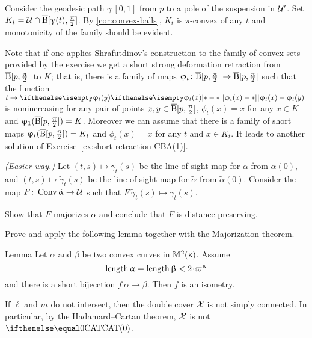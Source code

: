 Consider the geodesic path $\gamma\:[0,1]$ from $p$ to a pole of the suspension in $\mathcal{U}'$.
Set $K_t=\spc{U}\cap\cBall[\gamma(t),\tfrac\pi2]$.
By \ref{cor:convex-balls}, $K_t$ is $\pi$-convex of any $t$ and monotonicity of the family should be evident.

Note that if one applies Shrafutdinov's construction to the family of convex sets provided by the exercise we get a short strong deformation retraction from $\overline{\mathrm{B}}{}[p,\tfrac{\uppi}2]$ to $K$;
that is, there is a family of maps $\phi_t\:\cBall[p,\tfrac\pi2]\to \cBall[p,\tfrac\pi2]$ such that 
the function $t\mapsto \dist{\phi_t(x)}{\phi_t(y)}{}$ is nonincreasing for any pair of points $x,y\in\cBall[p,\tfrac\pi2]$, $\phi_t(x)=x$ for any $x\in K$ and $\upvarphi_1(\overline{\mathrm{B}}{}[p,\tfrac{\uppi}2])=K$. 
Moreover we can assume that there is a family of short maps $\upvarphi_t(\overline{\mathrm{B}}{}[p,\tfrac{\uppi}2])= K_t$ and $\phi_t(x)=x$ for any $t$ and $x\in K_t$.
It leads to another solution of Exercise~\ref{ex:short-retraction-CBA(1)}.




\textit{(Easier way.)} 
Let 
$(t,s)\mapsto \gamma_t(s)$ be the line-of-sight map 
for $\alpha$ from $\alpha(0)$,
and 
$(t,s)\mapsto \tilde \gamma_t(s)$ be the line-of-sight map 
for $\tilde \alpha$ from $\tilde \alpha(0)$.
Consider the map  $F\:\Conv\tilde \alpha\to \spc{U}$ such that 
$F\:\tilde \gamma_t(s)\mapsto \gamma_t(s)$.

Show that $F$ majorizes $\alpha$
and conclude that $F$ is distance-preserving.

Prove and apply the following lemma together with the Majorization theorem.
\begin{thm}{Lemma}\label{lem:short+convex}
Let $\alpha$ and $\beta$ be two convex curves in $\mathbb{M}_{{}}^{2}({\upkappa})$.
Assume 
\[\length \alpha=\length\beta<2\cdot\varpi\kappa\]
and there is a short bijecction $f\:\alpha\to\beta$.
Then $f$ is an isometry.
\end{thm}



If $\ell$ and $m$ do not intersect, then the double cover $\mathcal{X}$ is not simply connected.
In particular, by the Hadamard--Cartan theorem, $\mathcal{X}$ is not $\CAT0$.

